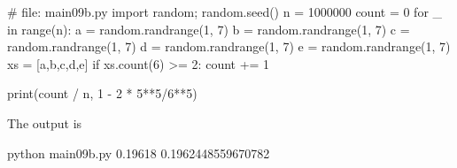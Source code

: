 \begin{console}[frame=single,fontsize=\footnotesize]
# file: main09b.py
import random; random.seed()
n = 1000000
count = 0
for _ in range(n):
    a = random.randrange(1, 7)
    b = random.randrange(1, 7)
    c = random.randrange(1, 7)
    d = random.randrange(1, 7)
    e = random.randrange(1, 7)
    xs = [a,b,c,d,e]
    if xs.count(6) >= 2: 
        count += 1

print(count / n, 1 - 2 * 5**5/6**5)
\end{console}
The output is
\begin{console} python main09b.py
0.19618 0.1962448559670782
\end{console}

